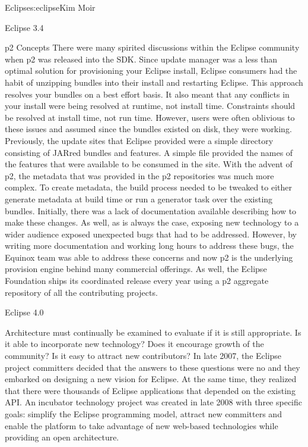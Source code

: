 \begin{aosachapter}{Eclipse}{s:eclipse}{Kim Moir}
\begin{aosasect1}{Eclipse 3.4}
\begin{aosasect2}{p2 Concepts}
There were many spirited discussions within the Eclipse community when p2
was released into the SDK\@. Since update manager was a less than
optimal solution for provisioning your Eclipse install, Eclipse
consumers had the habit of unzipping bundles into their install and
restarting Eclipse. This approach resolves your bundles on a best
effort basis. It also meant that any conflicts in your install were
being resolved at runtime, not install time.  Constraints should be
resolved at install time, not run time. However, users were often
oblivious to these issues and assumed since the bundles existed on
disk, they were working.  Previously, the update sites that Eclipse
provided were a simple directory consisting of JARred bundles and
features.  A simple  file provided the names of the
features that were available to be consumed in the site.  With the
advent of p2, the metadata that was provided in the p2 repositories
was much more complex. To create metadata, the build process needed to
be tweaked to either generate metadata at build time or run a
generator task over the existing bundles. Initially, there was a lack
of documentation available describing how to make these changes.  As
well, as is always the case, exposing new technology to a wider
audience exposed unexpected bugs that had to be addressed. However, by
writing more documentation and working long hours to address these
bugs, the Equinox team was able to address these concerns and now p2
is the underlying provision engine behind many commercial
offerings. As well, the Eclipse Foundation ships its coordinated
release every year using a p2 aggregate repository of all the
contributing projects.

\end{aosasect2}

\end{aosasect1}

\begin{aosasect1}{Eclipse 4.0}

Architecture must continually be examined to evaluate if it is still
appropriate. Is it able to incorporate new technology? Does it
encourage growth of the community?  Is it easy to attract new
contributors?  In late 2007, the Eclipse project committers decided
that the answers to these questions were no and they embarked on
designing a new vision for Eclipse. At the same time, they realized
that there were thousands of Eclipse applications that depended on the
existing API\@.  An incubator technology project was created in late
2008 with three specific goals: simplify the Eclipse programming
model, attract new committers and enable the platform to take
advantage of new web-based technologies while providing an open
architecture.


\end{aosasect1}
\end{aosachapter}

